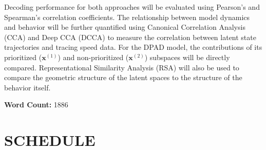 \documentclass[12pt, a4paper]{article}
\begin{document}
Decoding performance for both approaches will be evaluated using Pearson's and Spearman’s correlation coefficients. The relationship between model dynamics and behavior will be further quantified using Canonical Correlation Analysis (CCA) and Deep CCA (DCCA) to measure the correlation between latent state trajectories and tracing speed data. For the DPAD model, the contributions of its prioritized ($\mathbf{x}^{(1)}$) and non-prioritized ($\mathbf{x}^{(2)}$) subspaces will be directly compared. Representational Similarity Analysis (RSA) will also be used to compare the geometric structure of the latent spaces to the structure of the behavior itself.

\vspace{1em}
\noindent\textbf{Word Count:} 1886
\newpage
\section{SCHEDULE}
\end{document}
